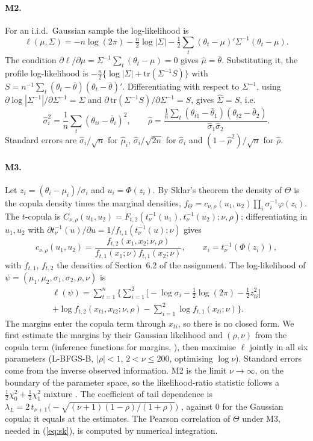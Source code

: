 \paragraph{M2.} For an i.i.d.\ Gaussian sample the log-likelihood is
\[
\ell(\mu,\Sigma)=-n\log(2\pi)-\tfrac n2\log|\Sigma|-\tfrac12\textstyle\sum_t(\theta_t-\mu)'\Sigma^{-1}(\theta_t-\mu).
\]
The condition $\partial\ell/\partial\mu=\Sigma^{-1}\sum_t(\theta_t-\mu)=0$ gives $\hat\mu=\bar\theta$. Substituting it, the profile log-likelihood is $-\frac n2\{\log|\Sigma|+\mathrm{tr}(\Sigma^{-1}S)\}$ with $S=n^{-1}\sum_t(\theta_t-\bar\theta)(\theta_t-\bar\theta)'$. Differentiating with respect to $\Sigma^{-1}$, using $\partial\log|\Sigma^{-1}|/\partial\Sigma^{-1}=\Sigma$ and $\partial\,\mathrm{tr}(\Sigma^{-1}S)/\partial\Sigma^{-1}=S$, gives $\hat\Sigma=S$, i.e.
\[
\hat\sigma_i^2=\frac1n\sum_t(\theta_{ti}-\bar\theta_i)^2,\qquad \hat\rho=\frac{\frac1n\sum_t(\theta_{t1}-\bar\theta_1)(\theta_{t2}-\bar\theta_2)}{\hat\sigma_1\hat\sigma_2}.
\]
Standard errors are $\hat\sigma_i/\sqrt n$ for $\hat\mu_i$, $\hat\sigma_i/\sqrt{2n}$ for $\hat\sigma_i$ and $(1-\hat\rho^2)/\sqrt n$ for $\hat\rho$.

\paragraph{M3.} Let $z_i=(\theta_i-\mu_i)/\sigma_i$ and $u_i=\Phi(z_i)$. By Sklar's theorem \citep[Sect.~5.1]{McNeil05} the density of $\Theta$ is the copula density times the marginal densities, $f_\Theta=c_{\nu,\rho}(u_1,u_2)\prod_i\sigma_i^{-1}\varphi(z_i)$. The $t$-copula is $C_{\nu,\rho}(u_1,u_2)=F_{t,2}(t_\nu^{-1}(u_1),t_\nu^{-1}(u_2);\nu,\rho)$; differentiating in $u_1,u_2$ with $\partial t_\nu^{-1}(u)/\partial u=1/f_{t,1}(t_\nu^{-1}(u);\nu)$ gives
\[
c_{\nu,\rho}(u_1,u_2)=\frac{f_{t,2}(x_1,x_2;\nu,\rho)}{f_{t,1}(x_1;\nu)f_{t,1}(x_2;\nu)},\qquad x_i=t_\nu^{-1}(\Phi(z_i)),
\]
with $f_{t,1}$, $f_{t,2}$ the densities of Section~6.2 of the assignment. The log-likelihood of $\psi=(\mu_1,\mu_2,\sigma_1,\sigma_2,\rho,\nu)$ is
\begin{multline*}
\ell(\psi)=\sum_{t=1}^n\Big\{\sum_{i=1}^2\big[-\log\sigma_i-\tfrac12\log(2\pi)-\tfrac12z_{ti}^2\big]\\
+\log f_{t,2}(x_{t1},x_{t2};\nu,\rho)-\sum_{i=1}^2\log f_{t,1}(x_{ti};\nu)\Big\}.
\end{multline*}
The margins enter the copula term through $x_{ti}$, so there is no closed form. We first estimate the margins by their Gaussian likelihood and $(\rho,\nu)$ from the copula term (inference functions for margins, \citealp[Sect.~5.5]{McNeil05}), then maximise $\ell$ jointly in all six parameters (L-BFGS-B, $|\rho|<1$, $2<\nu\le200$, optimising $\log\nu$). Standard errors come from the inverse observed information. M2 is the limit $\nu\to\infty$, on the boundary of the parameter space, so the likelihood-ratio statistic follows a $\frac12\chi^2_0+\frac12\chi^2_1$ mixture \citep{SelfLiang87}. The coefficient of tail dependence is $\lambda_L=2\,t_{\nu+1}\big(-\sqrt{(\nu+1)(1-\rho)/(1+\rho)}\big)$ \citep[Example~5.33]{McNeil05}, against $0$ for the Gaussian copula; it equals  at the estimates. The Pearson correlation of $\Theta$ under M3, needed in (\ref{eq:sk}), is computed by numerical integration.

